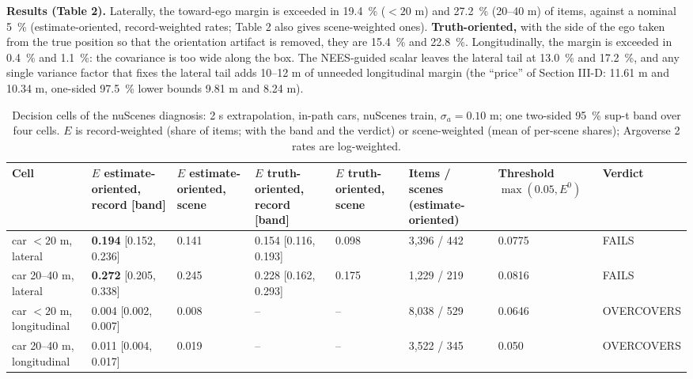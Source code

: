 \documentclass{ieeeaccess}
\begin{document}
\textbf{Results (Table 2).} Laterally, the toward-ego margin is exceeded in 19.4~\% ($< 20$ m) and 27.2~\% (20--40 m) of items, against a nominal 5~\% (estimate-oriented, record-weighted rates; Table 2 also gives scene-weighted ones). \textbf{Truth-oriented,} with the side of the ego taken from the true position so that the orientation artifact is removed, they are 15.4~\% and 22.8~\%. Longitudinally, the margin is exceeded in 0.4~\% and 1.1~\%: the covariance is too wide along the box. The NEES-guided scalar leaves the lateral tail at 13.0~\% and 17.2~\%, and any single variance factor that fixes the lateral tail adds 10--12 m of unneeded longitudinal margin (the ``price'' of Section III-D: 11.61 m and 10.34 m, one-sided 97.5~\% lower bounds 9.81 m and 8.24 m).

\begin{table}[!t]
\centering
\caption{Decision cells of the nuScenes diagnosis: 2 s extrapolation, in-path cars, nuScenes train, $\sigma_{a} = 0.10$ m; one two-sided 95~\% sup-t band over four cells. $E$ is record-weighted (share of items; with the band and the verdict) or scene-weighted (mean of per-scene shares); Argoverse 2 rates are log-weighted.}
\label{tab:2}
\footnotesize
\setlength{\tabcolsep}{3pt}
\renewcommand{\arraystretch}{1.15}
\begin{tabular}{@{}L{0.193\textwidth}L{0.142\textwidth}L{0.074\textwidth}L{0.142\textwidth}L{0.073\textwidth}L{0.080\textwidth}L{0.081\textwidth}L{0.126\textwidth}@{}}
\hline
Cell & $E$ estimate-oriented, record [band] & $E$ estimate-oriented, scene & $E$ truth-oriented, record [band] & $E$ truth-oriented, scene & Items / scenes (estimate-oriented) & Threshold $\max(0.05, E^{0})$ & Verdict \\
\hline
car $< 20$ m, lateral & \textbf{0.194} [0.152, 0.236] & 0.141 & 0.154 [0.116, 0.193] & 0.098 & 3,396 / 442 & 0.0775 & FAILS \\
car 20--40 m, lateral & \textbf{0.272} [0.205, 0.338] & 0.245 & 0.228 [0.162, 0.293] & 0.175 & 1,229 / 219 & 0.0816 & FAILS \\
car $< 20$ m, longitudinal & 0.004 [0.002, 0.007] & 0.008 & -- & -- & 8,038 / 529 & 0.0646 & OVERCOVERS \\
car 20--40 m, longitudinal & 0.011 [0.004, 0.017] & 0.019 & -- & -- & 3,522 / 345 & 0.050 & OVERCOVERS \\
\hline
\end{tabular}
\end{table}
\end{document}
